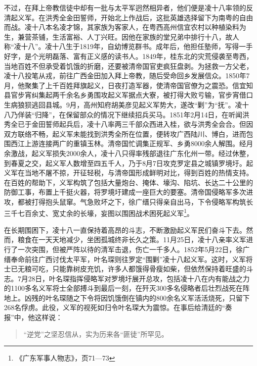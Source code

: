 不过，在拜上帝教信徒中却有一批与太平军迥然相异者，他们便是凌十八率领的反清起义军。在洪秀全金田誓师，开始北上作战后，这批英雄选择留下为南粤的自由而战。凌十八本名凌才锦，其家族为客家人，在粤西高州信宜农村以种植染料为生，兼营茶铺，生活富裕、人丁兴旺。因他在家族的堂兄弟中排行十八，故人称“凌十八”。凌十八生于1819年，自幼博览群书。成年后，他担任塾师，写得一手好字，是个光明磊落、富有正义感的读书人。1849年，桂东北的灾荒侵袭至粤西，当地百姓不但承受着饥饿的折磨，还要被清帝国官吏疯狂盘剥。为拯救一方父老，凌十八投笔从戎，前往广西金田加入拜上帝教，随后受命回乡发展信众。1850年7月，他聚集了上千百姓拜旗起义，日夜打造军器，使清帝国官僚为之震恐。信宜知县官步宵纠集起两千余名乡勇围攻起义军据点大寮，被打得大败亏输，官步宵借口生病狼狈逃回县城。9月，高州知府胡美彦见起义军势大，遂改“剿”为“抚”。凌十八乃佯装“归降”，在保留部众的情况下继续招兵买马。1851年2月14日，在听闻洪秀全已于金田誓师起兵后，凌十八率两三千部众西进入桂，欲与洪秀全会合。但因双方联络不畅，起义军未能找到洪秀全所在位置，便转攻广西陆川、博白，进而包围西江上游连接两广的重镇玉林。清帝国忙调集正规军、乡勇8000余人解围。经月余激战，起义军损失2000余人，凌十八只得率残部退往广东化州一带。经过休整，到春夏之交，起义军人数增至四五千人，乃于8月7日攻克罗定县之城镇罗境圩。起义军在当地不屠不掠，开征轻税，与清帝国形成鲜明对比，得到百姓的热情支持。在百姓的帮助下，义军构筑了包括大量炮台、掩体、壕沟、陷坑、长达二十公里的防御工事，布置上千挺火器，将罗境圩建成一座巨大的要塞。清帝国侵略军多次进攻，都被打得抱头鼠窜。气急败坏之下，徐广缙只得亲自出马，下令侵略军构筑长三千七百余丈、宽丈余的长壕，妄图以围困战术困死起义军\footnote{《广东军事人物志》，页71—73}。

在长期围困下，凌十八一直保持着高昂的斗志，不断激励起义军民们奋斗下去。然而，粮食在一天天地减少，坐困孤城终非长久之策。11月25日，凌十八亲率义军进行了一次突围，但被严阵以待的清军击退，伤亡一千多人。1852年5月22日，徐广缙奉命前往广西讨伐太平军，叶名琛则往罗定“围剿”凌十八起义军。这时，义军将士已无粮可吃，只能靠树皮充饥，许多人都饿得骨瘦如柴，但依然保持着旺盛的斗志。7月28日，叶名琛指挥侵略军对罗境圩展开总攻，包括凌十八在内有能战之力的1100多名义军将士全部搏斗到最后一刻，在歼灭300多名侵略者后壮烈战死在阵地上。凶残的叶名琛随之下令将因饥饿倒在镇内的800余名义军活活烧死，只留下268名俘虏。此役，义军的视死如归令叶名琛大为震惊。在事后给清廷的“奏报”中，他这样说：

\begin{quote}

“逆党”之坚忍信从，实为历来各“匪徒”所罕见。

\end{quote}

